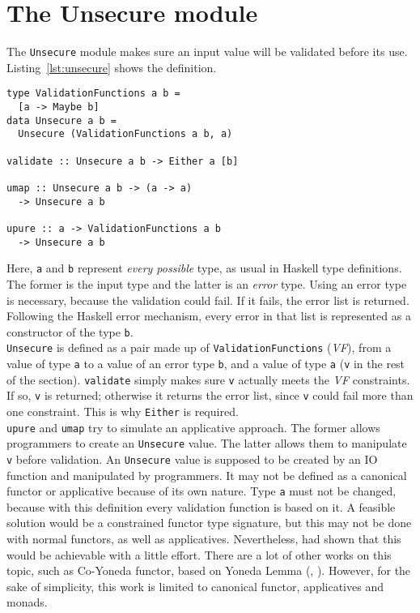 \section{The Unsecure module}\label{sec:unsecure}
The \texttt{Unsecure} module makes sure an input value will be validated before its use. Listing~\ref{lst:unsecure} shows the definition.

\begin{lstlisting}[caption={Unsecure module}, label={lst:unsecure}]
type ValidationFunctions a b =
  [a -> Maybe b]
data Unsecure a b =  
  Unsecure (ValidationFunctions a b, a)
 
validate :: Unsecure a b -> Either a [b]

umap :: Unsecure a b -> (a -> a) 
  -> Unsecure a b

upure :: a -> ValidationFunctions a b
  -> Unsecure a b
\end{lstlisting}
Here, \texttt{a} and \texttt{b} represent \textit{every possible} type, as usual in Haskell type definitions. The former is the input type and the latter is an \textit{error} type. Using an error type is necessary, because the validation could fail. If it fails, the error list is returned. Following the Haskell error mechanism, every error in that list is represented as a constructor of the type \texttt{b}. \\
\texttt{Unsecure} is defined as a pair made up of \texttt{ValidationFunctions} (\textit{VF}), from a value of type \texttt{a} to a value of an error type \texttt{b}, and a value of type \texttt{a} (\texttt{v} in the rest of the section). \texttt{validate} simply makes sure \texttt{v} actually meets the \textit{VF} constraints. If so, \texttt{v} is returned; otherwise it returns the error list, since \texttt{v} could fail more than one constraint. This is why \texttt{Either} is required. \\
\texttt{upure} and \texttt{umap} try to simulate an applicative approach. The former allows programmers to create an \texttt{Unsecure} value. The latter allows them to manipulate \texttt{v} before validation. An \texttt{Unsecure} value is supposed to be created by an IO function and manipulated by programmers. It may not be defined as a canonical functor or applicative because of its own nature. Type \texttt{a} must not be changed, because with this definition every validation function is based on it. A feasible solution would be a constrained functor type signature, but this may not be done with normal functors, as well as applicatives. Nevertheless, \citeauthor{Sculthorpe:13:ConstrainedMonad} \cite{Sculthorpe:13:ConstrainedMonad} had shown that this would be achievable with a little effort. There are a lot of other works on this topic, such as Co-Yoneda functor, based on Yoneda Lemma (\cite{elkins2009calculating}, \cite{yoneda}). However, for the sake of simplicity, this work is limited to canonical functor, applicatives and monads. \\
